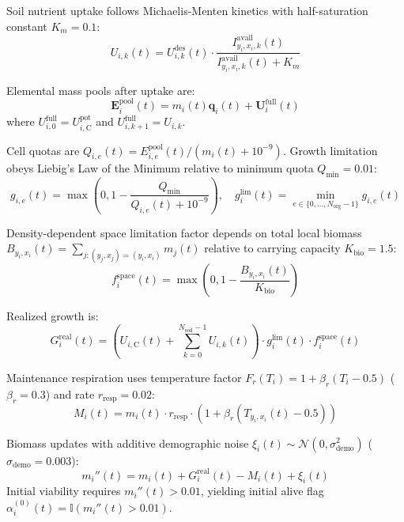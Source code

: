 \documentclass[11pt,a4paper]{article}
\begin{document}
Soil nutrient uptake follows Michaelis-Menten kinetics with half-saturation constant $K_m = 0.1$:
\begin{equation}
U_{i, k}(t) = U_{i, k}^{\text{des}}(t) \cdot \frac{I^{\text{avail}}_{y_i, x_i, k}(t)}{I^{\text{avail}}_{y_i, x_i, k}(t) + K_m}
\end{equation}

Elemental mass pools after uptake are:
\begin{equation}
\mathbf{E}_i^{\text{pool}}(t) = m_i(t) \boldsymbol{q}_i(t) + \mathbf{U}_i^{\text{full}}(t)
\end{equation}
where $U_{i, 0}^{\text{full}} = U_{i, \text{C}}^{\text{pot}}$ and $U_{i, k+1}^{\text{full}} = U_{i, k}$.

Cell quotas are $Q_{i, e}(t) = E_{i, e}^{\text{pool}}(t) / (m_i(t) + 10^{-9})$. Growth limitation obeys Liebig's Law of the Minimum relative to minimum quota $Q_{\min} = 0.01$:
\begin{equation}
g_{i, e}(t) = \max\left(0, 1 - \frac{Q_{\min}}{Q_{i, e}(t) + 10^{-9}}\right), \quad g_i^{\text{lim}}(t) = \min_{e \in \{0,\dots,N_{\text{org}}-1\}} g_{i, e}(t)
\end{equation}

Density-dependent space limitation factor depends on total local biomass $B_{y_i, x_i}(t) = \sum_{j: (y_j, x_j)=(y_i, x_i)} m_j(t)$ relative to carrying capacity $K_{\text{bio}} = 1.5$:
\begin{equation}
f_i^{\text{space}}(t) = \max\left(0, 1 - \frac{B_{y_i, x_i}(t)}{K_{\text{bio}}}\right)
\end{equation}

Realized growth is:
\begin{equation}
G_i^{\text{real}}(t) = \left(U_{i, \text{C}}(t) + \sum_{k=0}^{N_{\text{soil}}-1} U_{i, k}(t)\right) \cdot g_i^{\text{lim}}(t) \cdot f_i^{\text{space}}(t)
\end{equation}

Maintenance respiration uses temperature factor $F_r(T_i) = 1 + \beta_r (T_i - 0.5)$ ($\beta_r = 0.3$) and rate $r_{\text{resp}} = 0.02$:
\begin{equation}
M_i(t) = m_i(t) \cdot r_{\text{resp}} \cdot \left(1 + \beta_r (T_{y_i, x_i}(t) - 0.5)\right)
\end{equation}

Biomass updates with additive demographic noise $\xi_i(t) \sim \mathcal{N}(0, \sigma_{\text{demo}}^2)$ ($\sigma_{\text{demo}} = 0.003$):
\begin{equation}
m_i''(t) = m_i(t) + G_i^{\text{real}}(t) - M_i(t) + \xi_i(t)
\end{equation}
Initial viability requires $m_i''(t) > 0.01$, yielding initial alive flag $\alpha_i^{(0)}(t) = \mathbb{I}(m_i''(t) > 0.01)$.
\end{document}
